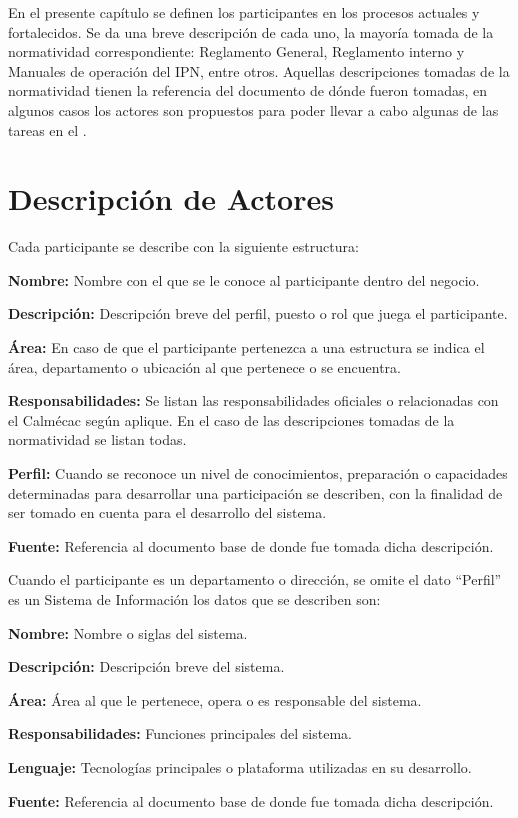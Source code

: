 \label{chapter:ActoresDelSistema}

	En el presente capítulo se definen los participantes en los procesos actuales y fortalecidos. Se da una breve descripción de cada uno, la mayoría tomada de la normatividad correspondiente: Reglamento General, Reglamento interno y Manuales de operación del IPN, entre otros. Aquellas descripciones tomadas de la normatividad tienen la referencia del documento de dónde fueron tomadas, en algunos casos los actores son propuestos para poder llevar a cabo algunas de las tareas en el .

\section{Descripción de Actores}

Cada participante se describe con la siguiente estructura:

\begin{objetivos}
	\item {\bf Nombre:} Nombre con el que se le conoce al participante dentro del negocio.
	\item {\bf Descripción:} Descripción breve del perfil, puesto o rol que juega el participante.
	\item {\bf Área:} En caso de que el participante pertenezca a una estructura se indica el área, departamento o ubicación al que pertenece o se encuentra.
	\item {\bf Responsabilidades:} Se listan las responsabilidades oficiales o relacionadas con el Calmécac según aplique. En el caso de las descripciones tomadas de la normatividad se listan todas.
	\item {\bf Perfil:} Cuando se reconoce un nivel de conocimientos, preparación o capacidades determinadas para desarrollar una participación se describen, con la finalidad de ser tomado en cuenta para el desarrollo del sistema.
	\item {\bf Fuente:} Referencia al documento base de donde fue tomada dicha descripción.
\end{objetivos}

Cuando el participante es un departamento o dirección, se omite el dato ``Perfil'' es un Sistema de Información los datos que se describen son:

\begin{objetivos}
	\item {\bf Nombre:} Nombre o siglas del sistema.
	\item {\bf Descripción:} Descripción breve del sistema.
	\item {\bf Área:} Área al que le pertenece, opera o es responsable del sistema.
	\item {\bf Responsabilidades:} Funciones principales del sistema.
	\item {\bf Lenguaje:} Tecnologías principales o plataforma utilizadas en su desarrollo.
	\item {\bf Fuente:} Referencia al documento base de donde fue tomada dicha descripción.
\end{objetivos}

